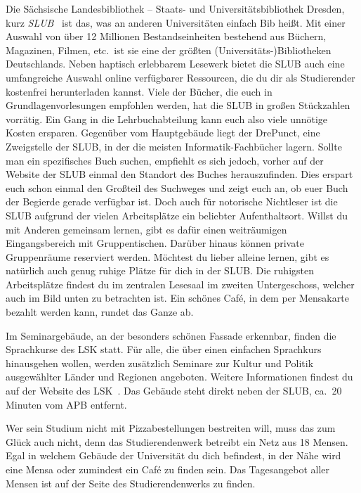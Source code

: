 Die Sächsische Landesbibliothek – Staats- und Universitätsbibliothek Dresden, kurz \emph{SLUB}~ ist das, was an anderen Universitäten einfach Bib heißt.
Mit einer Auswahl von über 12 Millionen Bestandseinheiten bestehend aus Büchern, Magazinen, Filmen, etc.\ ist sie eine der größten (Universitäts-)Bibliotheken Deutschlands.
Neben haptisch erlebbarem Lesewerk bietet die SLUB auch eine umfangreiche Auswahl online verfügbarer Ressourcen, die du dir als Studierender kostenfrei herunterladen kannst.
Viele der Bücher, die euch in Grundlagenvorlesungen empfohlen werden, hat die SLUB in großen Stückzahlen vorrätig. Ein Gang in die Lehrbuchabteilung kann euch also viele unnötige Kosten ersparen.
Gegenüber vom Hauptgebäude liegt der DrePunct, eine Zweigstelle der SLUB, in der die meisten Informatik-Fachbücher lagern. Sollte man ein spezifisches Buch suchen, empfiehlt es sich jedoch, vorher auf der Website der
SLUB einmal den Standort des Buches herauszufinden. Dies erspart euch schon einmal den Großteil des Suchweges und zeigt euch an, ob euer Buch der Begierde gerade verfügbar ist.\newline
Doch auch für notorische Nichtleser ist die SLUB aufgrund der vielen Arbeitsplätze ein beliebter Aufenthaltsort.
Willst du mit Anderen gemeinsam lernen, gibt es dafür einen weiträumigen Eingangsbereich mit Gruppentischen.
Darüber hinaus können private Gruppenräume reserviert werden. Möchtest du lieber alleine lernen, gibt es natürlich auch genug ruhige Plätze für dich in der SLUB. Die ruhigsten Arbeitsplätze findest du im zentralen Lesesaal
im zweiten Untergeschoss, welcher auch im Bild unten zu betrachten ist. Ein schönes Café, in dem per Mensakarte bezahlt werden kann, rundet das Ganze ab.

\newpage
{}
Im Seminargebäude, an der besonders schönen Fassade erkennbar, finden die Sprachkurse des LSK statt.
Für alle, die über einen einfachen Sprachkurs hinausgehen wollen, werden zusätzlich Seminare zur Kultur und Politik ausgewählter Länder und Regionen angeboten.
Weitere Informationen findest du auf der Website des LSK~.
Das Gebäude steht direkt neben der SLUB, ca.\ 20 Minuten vom APB entfernt.

Wer sein Studium nicht mit Pizzabestellungen bestreiten will, muss das zum Glück auch nicht, denn das Studierendenwerk betreibt ein Netz aus 18 Mensen.
Egal in welchem Gebäude der Universität du dich befindest, in der Nähe wird eine Mensa oder zumindest ein Café zu finden sein.
Das Tagesangebot aller Mensen ist auf der Seite des Studierendenwerks  zu finden.

